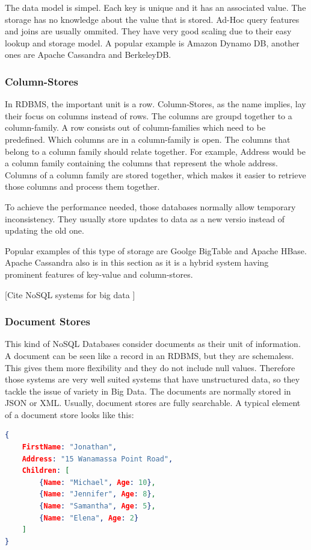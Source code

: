 \documentclass{acm_proc_article-sp}
\begin{document}
The data model is simpel. Each key is unique and it has an associated value. The storage has no knowledge about the value that is stored. Ad-Hoc query features and joins are usually ommited. They have very good scaling due to their easy lookup and storage model. A popular example is Amazon Dynamo DB, another ones are Apache Cassandra and BerkeleyDB.
	
\subsubsection{Column-Stores}

In RDBMS, the important unit is a row. Column-Stores, as the name implies, lay their focus on columns instead of rows. The columns are groupd together to a column-family. A row consists out of column-families which need to be predefined. Which columns are in a column-family is open. The columns that belong to a column family should relate together. For example, Address would be a column family containing the columns that represent the whole address. Columns of a column family are stored together, which makes it easier to retrieve those columns and process them together.

To achieve the performance needed, those databases normally allow temporary inconsistency. They usually store updates to data as a new versio instead of updating the old one.

Popular examples of this type of storage are Goolge BigTable and Apache HBase. Apache Cassandra also is in this section as it is a hybrid system having prominent features of key-value and column-stores.

[Cite NoSQL systems for big data ]

\subsubsection{Document Stores}

This kind of NoSQL Databases consider documents as their unit of information. A
document can be seen like a record in an RDBMS, but they are schemaless. This
gives them more flexibility and they do not include null values. Therefore those systems are very well suited systems that have unstructured data, so they tackle the issue of variety in Big Data.
The documents are normally stored in JSON or XML. Usually, document stores are fully searchable. A typical element of a document store looks
like this:

\begin{lstlisting}[language=json,firstnumber=1]
{
	FirstName: "Jonathan",
	Address: "15 Wanamassa Point Road",
	Children: [
		{Name: "Michael", Age: 10},
		{Name: "Jennifer", Age: 8},
		{Name: "Samantha", Age: 5},
		{Name: "Elena", Age: 2}
	]
}
\end{lstlisting}
\end{document}
